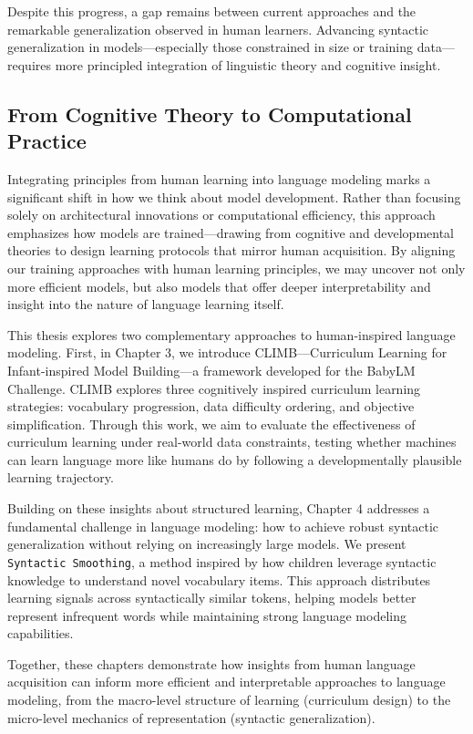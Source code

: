 \vspace{1em}

Despite this progress, a gap remains between current approaches and the remarkable generalization observed in human learners. Advancing syntactic generalization in models—especially those constrained in size or training data—requires more principled integration of linguistic theory and cognitive insight.

\subsection*{From Cognitive Theory to Computational Practice}

Integrating principles from human learning into language modeling marks a significant shift in how we think about model development. Rather than focusing solely on architectural innovations or computational efficiency, this approach emphasizes how models are trained—drawing from cognitive and developmental theories to design learning protocols that mirror human acquisition. By aligning our training approaches with human learning principles, we may uncover not only more efficient models, but also models that offer deeper interpretability and insight into the nature of language learning itself.

This thesis explores two complementary approaches to human-inspired language modeling. First, in Chapter 3, we introduce CLIMB—Curriculum Learning for Infant-inspired Model Building—a framework developed for the BabyLM Challenge. CLIMB explores three cognitively inspired curriculum learning strategies: vocabulary progression, data difficulty ordering, and objective simplification. Through this work, we aim to evaluate the effectiveness of curriculum learning under real-world data constraints, testing whether machines can learn language more like humans do by following a developmentally plausible learning trajectory.

Building on these insights about structured learning, Chapter 4 addresses a fundamental challenge in language modeling: how to achieve robust syntactic generalization without relying on increasingly large models. We present \texttt{Syntactic Smoothing}, a method inspired by how children leverage syntactic knowledge to understand novel vocabulary items. This approach distributes learning signals across syntactically similar tokens, helping models better represent infrequent words while maintaining strong language modeling capabilities.

Together, these chapters demonstrate how insights from human language acquisition can inform more efficient and interpretable approaches to language modeling, from the macro-level structure of learning (curriculum design) to the micro-level mechanics of representation (syntactic generalization).